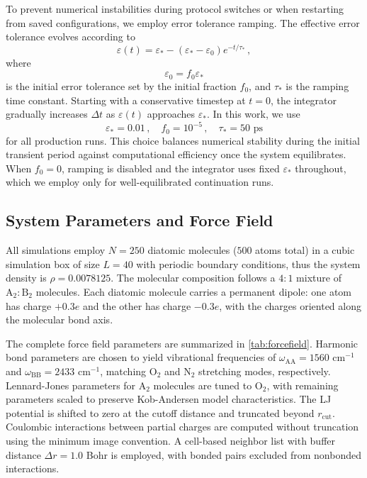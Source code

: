 \documentclass[%
 reprint,
 amsmath,amssymb,
 aps,
]{revtex4-2}
\begin{document}
To prevent numerical instabilities during protocol switches or when restarting from saved configurations, we employ error tolerance ramping.
The effective error tolerance evolves according to
\begin{equation}
\varepsilon(t) = \varepsilon_* - \left(\varepsilon_* - \varepsilon_0\right) e^{-t/\tau_*} \,,
\end{equation}
where
\begin{equation}
\varepsilon_0 = f_0 \varepsilon_*
\end{equation}
is the initial error tolerance set by the initial fraction $f_0$, and $\tau_*$ is the ramping time constant.
Starting with a conservative timestep at $t=0$, the integrator gradually increases $\Delta t$ as $\varepsilon(t)$ approaches $\varepsilon_*$.
In this work, we use
\begin{equation}
\varepsilon_* = 0.01 \,, \quad f_0 = 10^{-5} \,, \quad \tau_* = 50\text{ ps}
\end{equation}
for all production runs.
This choice balances numerical stability during the initial transient period against computational efficiency once the system equilibrates.
When $f_0 = 0$, ramping is disabled and the integrator uses fixed $\varepsilon_*$ throughout, which we employ only for well-equilibrated continuation runs.

\subsection{System Parameters and Force Field}

All simulations employ $N=250$ diatomic molecules ($500$ atoms total) in a cubic simulation box of size $L = 40$ with periodic boundary conditions, thus the system density is $\rho = 0.0078125$.
The molecular composition follows a $4:1$ mixture of $\mathrm{A}_2:\mathrm{B}_2$ molecules.
Each diatomic molecule carries a permanent dipole: one atom has charge $+0.3e$ and the other has charge $-0.3e$, with the charges oriented along the molecular bond axis.

The complete force field parameters are summarized in \cref{tab:forcefield}.
Harmonic bond parameters are chosen to yield vibrational frequencies of $\omega_{\mathrm{AA}} = 1560$ cm$^{-1}$ and $\omega_{\mathrm{BB}} = 2433$ cm$^{-1}$, matching O$_2$ and N$_2$ stretching modes, respectively.
Lennard-Jones parameters for $\mathrm{A}_2$ molecules are tuned to O$_2$, with remaining parameters scaled to preserve Kob-Andersen model characteristics.
The LJ potential is shifted to zero at the cutoff distance and truncated beyond $r_\mathrm{cut}$.
Coulombic interactions between partial charges are computed without truncation using the minimum image convention.
A cell-based neighbor list with buffer distance $\Delta r = 1.0$ Bohr is employed, with bonded pairs excluded from nonbonded interactions.
\end{document}
